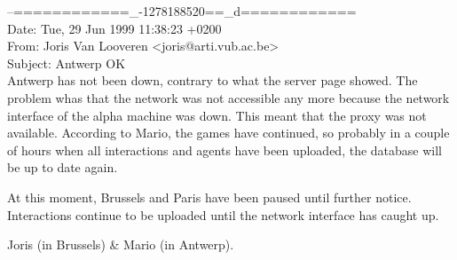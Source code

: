 \begin{mail}
--============\_-1278188520==\_d============\\
Date: Tue, 29 Jun 1999 11:38:23 +0200\\
From: Joris Van Looveren <joris@arti.vub.ac.be>\\
Subject: Antwerp OK\\

Antwerp has not been down, contrary to what the server page showed. The
problem whas that the network was not accessible any more because the
network interface of the alpha machine was down. This meant that the
proxy was not available. According to Mario, the games have continued,
so probably in a couple of hours when all interactions and agents have
been uploaded, the database will be up to date again. 

At this moment, Brussels and Paris have been paused until further
notice. Interactions continue to be uploaded until the network interface
has caught up.

Joris (in Brussels) \& Mario (in Antwerp).
\end{mail}

